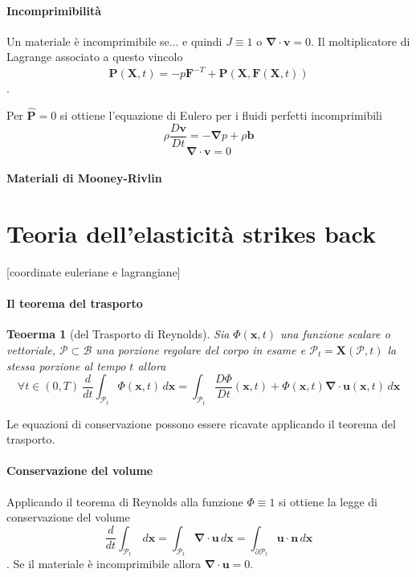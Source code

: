 \documentclass{book}
\newtheorem{theorem}{Teoerma}[section]
\newcommand{\Nabla}{\boldsymbol{\nabla}}
\begin{document}
\paragraph{Incomprimibilità}
Un materiale è incomprimibile se...
e quindi $J\equiv 1$ o $\Nabla\cdot\mathbf{v}=0$.
Il moltiplicatore di Lagrange associato a questo vincolo
$$\mathbf{P}(\mathbf{X},t)=-p\mathbf{F}^{-T}+\widehat{\mathbf{P}}(\mathbf{X},\mathbf{F}(\mathbf{X},t))$$.

Per $\widehat{\mathbf{P}}=0$  si ottiene l'equazione di Eulero per i fluidi perfetti incomprimibili
$$\rho\frac{D \mathbf{v}}{Dt} = -\Nabla p+\rho\mathbf{b}$$
$$\Nabla\cdot\mathbf{v}=0$$
\paragraph{Materiali di Mooney-Rivlin}


\section{Teoria dell'elasticità strikes back}
[coordinate euleriane e lagrangiane]

\paragraph{Il teorema del trasporto}

\begin{theorem}[del Trasporto di Reynolds]
	Sia $\Phi(\mathbf{x},t)$ una funzione scalare o vettoriale, $\mathcal{P}\subset\mathcal{B}$ una porzione regolare del corpo in esame e  $\mathcal{P}_t = \mathbf{X}(\mathcal{P},t)$ la stessa porzione al tempo $t$ allora
	$$\forall t \in (0,T)\> \frac{d}{dt}\int_{\mathcal{P}_t}\Phi(\mathbf{x},t)\,d\mathbf{x}=\int_{\mathcal{P}_t}\frac{D\Phi}{Dt}(\mathbf{x},t)+\Phi(\mathbf{x},t)\Nabla\cdot\mathbf{u}(\mathbf{x},t)\,d\mathbf{x}$$
\end{theorem}

Le equazioni di conservazione possono essere ricavate applicando il teorema del trasporto.

\paragraph{Conservazione del volume}
Applicando il teorema di Reynolds alla funzione $\Phi \equiv 1$ si ottiene la legge di conservazione del volume
$$\frac{d}{dt}\int_{\mathcal{P}_t}\,d\mathbf{x}=\int_{\mathcal{P}_t}\Nabla\cdot\mathbf{u}\,d\mathbf{x}=\int_{\partial\mathcal{P}_t}\mathbf{u}\cdot\mathbf{n}\,d\mathbf{x} $$.
Se il materiale è incomprimibile allora $\Nabla\cdot\mathbf{u}=0$.
\end{document}
